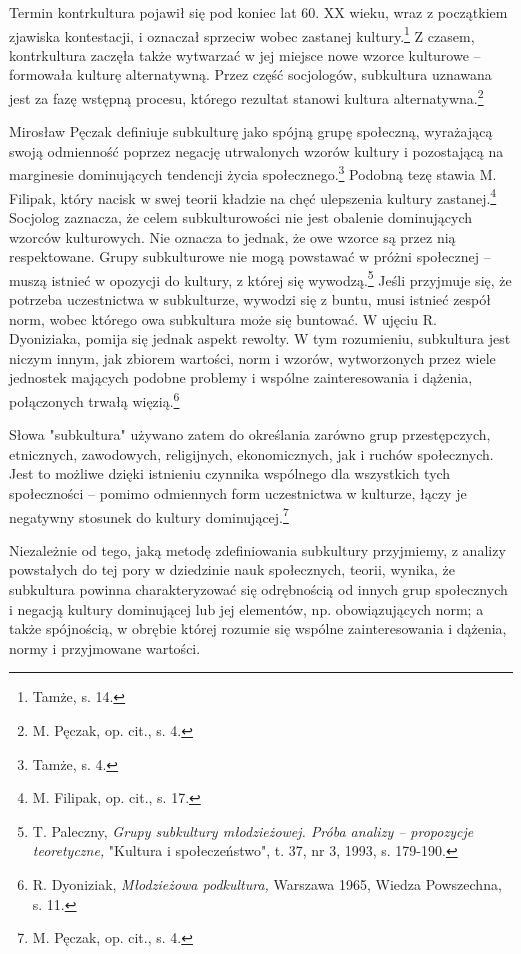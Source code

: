\documentclass[12pt, a4paper, titlepage]{report}
\begin{document}
Termin kontrkultura pojawił się pod koniec lat 60. XX wieku, wraz z początkiem zjawiska kontestacji, i oznaczał sprzeciw wobec zastanej kultury.\footnote{Tamże, s. 14.} Z czasem, kontrkultura zaczęła także wytwarzać w jej miejsce nowe wzorce kulturowe -- formowała kulturę alternatywną. Przez część socjologów, subkultura uznawana jest za fazę wstępną procesu, którego rezultat stanowi kultura alternatywna.\footnote{M. Pęczak, op. cit., s. 4.}

Mirosław Pęczak definiuje subkulturę jako spójną grupę społeczną, wyrażającą swoją odmienność poprzez negację utrwalonych wzorów kultury i pozostającą na marginesie dominujących tendencji życia społecznego.\footnote{Tamże, s. 4.} Podobną tezę stawia M. Filipak, który nacisk w swej teorii kładzie na chęć ulepszenia kultury zastanej.\footnote{M. Filipak, op. cit., s. 17.} Socjolog zaznacza, że celem subkulturowości nie jest obalenie dominujących wzorców kulturowych. Nie oznacza to jednak, że owe wzorce są przez nią respektowane. Grupy subkulturowe nie mogą powstawać w próżni społecznej -- muszą istnieć w opozycji do kultury, z której się wywodzą.\footnote{T. Paleczny, \textit{Grupy subkultury młodzieżowej. Próba analizy -- propozycje teoretyczne,} "Kultura i społeczeństwo", t. 37, nr 3, 1993, s. 179-190.} Jeśli przyjmuje się, że potrzeba uczestnictwa w subkulturze, wywodzi się z buntu, musi istnieć zespół norm, wobec którego owa subkultura może się buntować. W ujęciu R. Dyoniziaka, pomija się jednak aspekt rewolty. W tym rozumieniu, subkultura jest niczym innym, jak zbiorem wartości, norm i wzorów, wytworzonych przez wiele jednostek mających podobne problemy i wspólne zainteresowania i dążenia, połączonych trwałą więzią.\footnote{R. Dyoniziak, \textit{Młodzieżowa podkultura,} Warszawa 1965, Wiedza Powszechna, s. 11.} 

Słowa "subkultura" używano zatem do określania zarówno grup przestępczych, etnicznych, zawodowych, religijnych, ekonomicznych, jak i ruchów społecznych. Jest to możliwe dzięki istnieniu czynnika wspólnego dla wszystkich tych społeczności -- pomimo odmiennych form uczestnictwa w kulturze, łączy je negatywny stosunek do kultury dominującej.\footnote{M. Pęczak, op. cit., s. 4.}

Niezależnie od tego, jaką metodę zdefiniowania subkultury przyjmiemy, z analizy powstałych do tej pory w dziedzinie nauk społecznych, teorii, wynika, że subkultura powinna charakteryzować się odrębnością od innych grup społecznych i negacją kultury dominującej lub jej elementów, np. obowiązujących norm; a także spójnością, w obrębie której rozumie się wspólne zainteresowania i dążenia, normy i przyjmowane wartości. 
\end{document}
